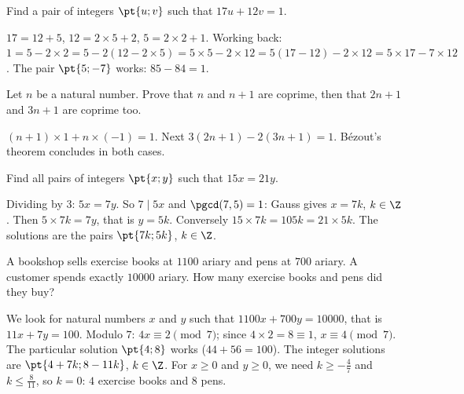 \begin{exercise}
Find a pair of integers $\pt{u;v}$ such that $17u+12v=1$.
\end{exercise}
\begin{solution}
$17=12+5$, $12=2\times5+2$, $5=2\times2+1$. Working back: $1=5-2\times2=5-2(12-2\times5)=5\times5-2\times12=5(17-12)-2\times12=5\times17-7\times12$. The pair $\pt{5;-7}$ works: $85-84=1$.
\end{solution}

\begin{exercise}
Let $n$ be a natural number. Prove that $n$ and $n+1$ are coprime, then that $2n+1$ and $3n+1$ are coprime too.
\end{exercise}
\begin{solution}
$(n+1)\times1+n\times(-1)=1$. Next $3(2n+1)-2(3n+1)=1$. Bézout's theorem concludes in both cases.
\end{solution}

\begin{exercise}
Find all pairs of integers $\pt{x;y}$ such that $15x=21y$.
\end{exercise}
\begin{solution}
Dividing by $3$: $5x=7y$. So $7\mid5x$ and $\pgcd(7,5)=1$: Gauss gives $x=7k$, $k\in\Z$. Then $5\times7k=7y$, that is $y=5k$. Conversely $15\times7k=105k=21\times5k$. The solutions are the pairs $\pt{7k;5k}$, $k\in\Z$.
\end{solution}

\begin{exercise}
A bookshop sells exercise books at $\num{1100}$ ariary and pens at $700$ ariary. A customer spends exactly $\num{10000}$ ariary. How many exercise books and pens did they buy?
\end{exercise}
\begin{solution}
We look for natural numbers $x$ and $y$ such that $\num{1100}x+700y=\num{10000}$, that is $11x+7y=100$. Modulo $7$: $4x\equiv2\pmod7$; since $4\times2=8\equiv1$, $x\equiv4\pmod7$. The particular solution $\pt{4;8}$ works ($44+56=100$). The integer solutions are $\pt{4+7k;8-11k}$, $k\in\Z$. For $x\ge0$ and $y\ge0$, we need $k\ge-\frac47$ and $k\le\frac8{11}$, so $k=0$: $4$ exercise books and $8$ pens.
\end{solution}

